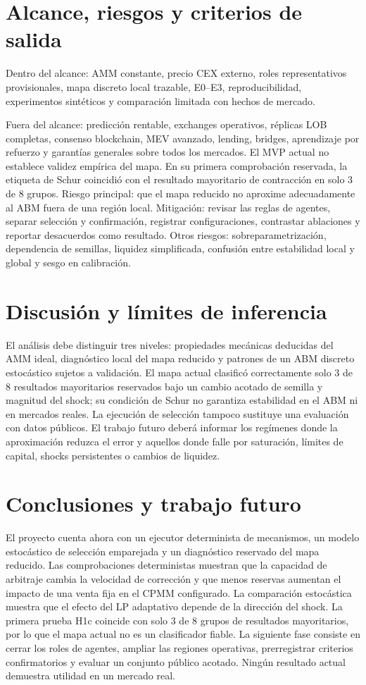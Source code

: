 \section{Alcance, riesgos y criterios de salida}

Dentro del alcance: AMM constante, precio CEX externo, roles representativos
provisionales, mapa discreto local trazable, E0--E3, reproducibilidad, experimentos
sintéticos y comparación limitada con hechos de mercado.

Fuera del alcance: predicción rentable, exchanges operativos, réplicas LOB completas,
consenso blockchain, MEV avanzado, lending, bridges, aprendizaje por refuerzo y
garantías generales sobre todos los mercados. El MVP actual no establece validez
empírica del mapa. En su primera comprobación reservada, la etiqueta de Schur coincidió
con el resultado mayoritario de contracción en solo 3 de 8 grupos. Riesgo principal:
que el mapa reducido no aproxime adecuadamente al ABM fuera de una región local.
Mitigación: revisar las reglas de agentes, separar selección y confirmación, registrar
configuraciones, contrastar ablaciones y reportar desacuerdos como resultado. Otros
riesgos: sobreparametrización, dependencia de semillas, liquidez simplificada, confusión
entre estabilidad local y global y sesgo en calibración.

\section{Discusión y límites de inferencia}

El análisis debe distinguir tres niveles: propiedades mecánicas deducidas del AMM ideal,
diagnóstico local del mapa reducido y patrones de un ABM discreto estocástico sujetos a
validación. El mapa actual clasificó correctamente solo 3 de 8 resultados mayoritarios
reservados bajo un cambio acotado de semilla y magnitud del shock; su condición de Schur
no garantiza estabilidad en el ABM ni en mercados reales. La ejecución de selección
tampoco sustituye una evaluación con datos públicos. El trabajo futuro deberá informar
los regímenes donde la aproximación reduzca el error y aquellos donde falle por
saturación, límites de capital, shocks persistentes o cambios de liquidez.

\section{Conclusiones y trabajo futuro}

El proyecto cuenta ahora con un ejecutor determinista de mecanismos, un modelo
estocástico de selección emparejada y un diagnóstico reservado del mapa reducido. Las
comprobaciones deterministas muestran que la capacidad de arbitraje cambia la velocidad
de corrección y que menos reservas aumentan el impacto de una venta fija en el CPMM
configurado. La comparación estocástica muestra que el efecto del LP adaptativo depende
de la dirección del shock. La primera prueba H1c coincide con solo 3 de 8 grupos de
resultados mayoritarios, por lo que el mapa actual no es un clasificador fiable. La
siguiente fase consiste en cerrar los roles de agentes, ampliar las regiones operativas,
prerregistrar criterios confirmatorios y evaluar un conjunto público acotado. Ningún
resultado actual demuestra utilidad en un mercado real.
